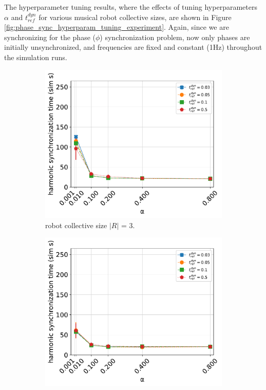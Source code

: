 	The hyperparameter tuning results, where the effects of tuning hyperparameters $\alpha$ and $t_{ref}^{dyn}$ for various musical robot collective sizes, are shown in Figure \ref{fig:phase_sync_hyperparam_tuning_experiment}. Again, since we are synchronizing for the phase ($\phi$) synchronization problem, now only phases are initially unsynchronized, and frequencies are fixed and constant (1Hz) throughout the simulation runs.
	
	\begin{figure}[ht!]
	  \begin{subfigure}[b]{0.5\textwidth}
		\centering\captionsetup{width=.9\linewidth}%
		\includegraphics[width=\textwidth]{Assets/DocSegments/Chapters/ExperimentsAndResults/Figures/PerfScores/t_ref_dyn_x_alpha_hyperparamtuning_experiment_plot_collsize3.pdf}
		\caption{robot collective size $|R|$ = 3.}
		\label{fig:sub:t_ref_dyn_x_alpha_collsize3}
	  \end{subfigure}
	  \begin{subfigure}[b]{0.5\textwidth}
		\centering\captionsetup{width=.9\linewidth}%
		\includegraphics[width=\textwidth]{Assets/DocSegments/Chapters/ExperimentsAndResults/Figures/PerfScores/t_ref_dyn_x_alpha_hyperparamtuning_experiment_plot_collsize10.pdf}

\end{subfigure}
\end{figure}
